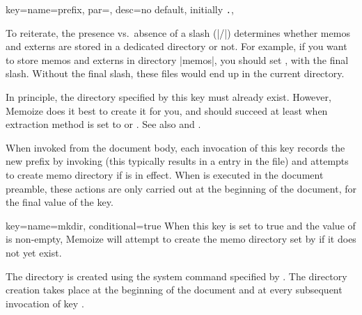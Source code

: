 \documentclass[a4paper,11pt]{article}
\begin{document}
\begin{doc}{
    key={name=prefix, par=,
      desc={no default, initially \texttt{\string\jobname.}}},
  }
  \begin{tcolorbox}[warning,title=The final slash matters]
    To reiterate, the presence vs.\ absence of a slash (|/|) determines whether
    memos and externs are stored in a dedicated directory or not.  For example,
    if you want to store memos and externs in directory |memos|, you should set
    , with the final slash.  Without the final
    slash, these files would end up in the current directory.
  \end{tcolorbox}

  In principle, the directory specified by this key must already exist.
  However, Memoize does it best to create it for you, and should succeed at
  least when extraction method is set to  or
  .  See also  and .

  When invoked from the document body, each invocation of this key records the
  new prefix by invoking  (this typically
  results in a  entry in the \dmmz file) and attempts to
  create memo directory if  is in effect.  When 
  is executed in the document preamble, these actions are only carried out at
  the beginning of the document, for the final value of the key.

  
\end{doc}

\begin{doc}{key={name=mkdir, conditional=true}}
  When this key is set to true and the value of  is
  non-empty, Memoize will attempt to create the memo directory set by
   if it does not yet exist.

  The directory is created using the system command specified by .  The directory creation takes place at the beginning of the
  document and at every subsequent invocation of key .
\end{doc}
\end{document}
